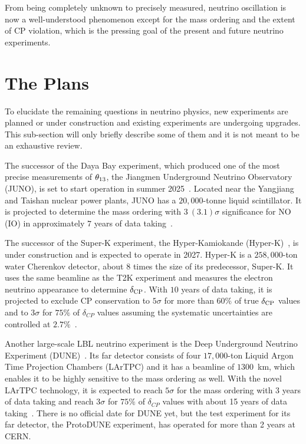 From being completely unknown to precisely measured, neutrino oscillation is now a well-understood phenomenon except for the mass ordering and the extent of CP violation, which is the pressing goal of the present and future neutrino experiments.
 
\section{The Plans}
To elucidate the remaining questions in neutrino physics, new experiments are planned or under construction and existing experiments are undergoing upgrades.
This sub-section will only briefly describe some of them and it is not meant to be an exhaustive review.

The successor of the Daya Bay experiment, which produced one of the most precise measurements of $\theta_{13}$, the Jiangmen Underground Neutrino Observatory (JUNO), is set to start operation in summer 2025~\cite{ScienceNews2025}.
Located near the Yangjiang and Taishan nuclear power plants, JUNO has a $20,000$-tonne liquid scintillator.
It is projected to determine the mass ordering with $3~(3.1)\sigma$ significance for NO (IO) in approximately $7$ years of data taking~\cite{Paoloni:2024atc}.

The successor of the Super-K experiment, the Hyper-Kamiokande (Hyper-K)~\cite{Hyper-Kamiokande:2018ofw}, is under construction and is expected to operate in 2027.
Hyper-K is a $258,000$-ton water Cherenkov detector, about $8$ times the size of its predecessor, Super-K.
It uses the same beamline as the T2K experiment and measures the electron neutrino appearance to determine $\delta_\textrm{CP}$.
With $10$ years of data taking, it is projected to exclude CP conservation to $5\sigma$ for more than $60\%$ of true $\delta_\textrm{CP}$ values and to $3\sigma$ for $75\%$ of $\delta_{CP}$ values assuming the systematic uncertainties are controlled at $2.7\%$~\cite{Jesus-Valls:2024ady}.

Another large-scale LBL neutrino experiment is the Deep Underground Neutrino Experiment (DUNE)~\cite{DUNE:2016hlj,DUNE:2015lol,DUNE:2016evb,DUNE:2016rla,DUNE:2021tad}.
Its far detector consists of four $17,000$-ton Liquid Argon Time Projection Chambers (LArTPC) and it has a beamline of $1300$~km, which enables it to be highly sensitive to the mass ordering as well.
With the novel LArTPC technology, it is expected to reach $5\sigma$ for the mass ordering with 3 years of data taking and reach $3\sigma$ for $75\%$ of $\delta_{CP}$ values with about 15 years of data taking~\cite{Gil-Botella:2024duf}.
There is no official date for DUNE yet, but the test experiment for its far detector, the ProtoDUNE experiment, has operated for more than 2 years at CERN.

